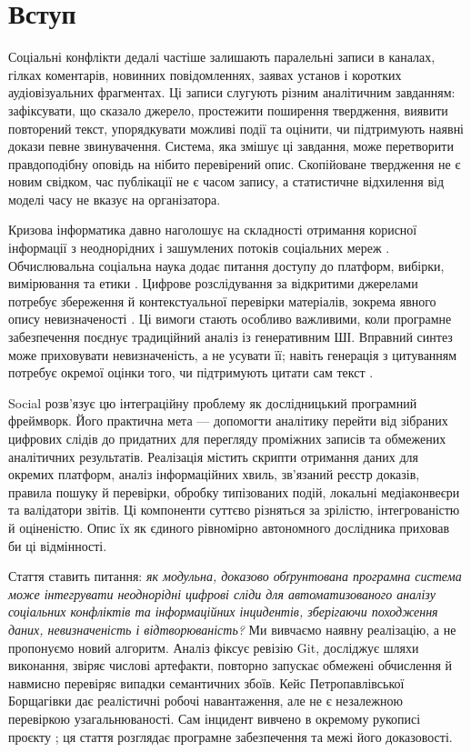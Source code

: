 \section{Вступ}
Соціальні конфлікти дедалі частіше залишають паралельні записи в каналах, гілках коментарів, новинних повідомленнях, заявах установ і коротких аудіовізуальних фрагментах. Ці записи слугують різним аналітичним завданням: зафіксувати, що сказало джерело, простежити поширення твердження, виявити повторений текст, упорядкувати можливі події та оцінити, чи підтримують наявні докази певне звинувачення. Система, яка змішує ці завдання, може перетворити правдоподібну оповідь на нібито перевірений опис. Скопійоване твердження не є новим свідком, час публікації не є часом запису, а статистичне відхилення від моделі часу не вказує на організатора.

Кризова інформатика давно наголошує на складності отримання корисної інформації з неоднорідних і зашумлених потоків соціальних мереж \citep{imran2015crisis}. Обчислювальна соціальна наука додає питання доступу до платформ, вибірки, вимірювання та етики \citep{Olteanu2019,VicentePaula2023}. Цифрове розслідування за відкритими джерелами потребує збереження й контекстуальної перевірки матеріалів, зокрема явного опису невизначеності \citep{berkeleyProtocol2022}. Ці вимоги стають особливо важливими, коли програмне забезпечення поєднує традиційний аналіз із генеративним ШІ. Вправний синтез може приховувати невизначеність, а не усувати її; навіть генерація з цитуванням потребує окремої оцінки того, чи підтримують цитати сам текст \citep{gao2023alce}.

Social розв'язує цю інтеграційну проблему як дослідницький програмний фреймворк. Його практична мета --- допомогти аналітику перейти від зібраних цифрових слідів до придатних для перегляду проміжних записів та обмежених аналітичних результатів. Реалізація містить скрипти отримання даних для окремих платформ, аналіз інформаційних хвиль, зв'язаний реєстр доказів, правила пошуку й перевірки, обробку типізованих подій, локальні медіаконвеєри та валідатори звітів. Ці компоненти суттєво різняться за зрілістю, інтегрованістю й оціненістю. Опис їх як єдиного рівномірно автономного дослідника приховав би ці відмінності.

Стаття ставить питання: \emph{як модульна, доказово обґрунтована програмна система може інтегрувати неоднорідні цифрові сліди для автоматизованого аналізу соціальних конфліктів та інформаційних інцидентів, зберігаючи походження даних, невизначеність і відтворюваність?} Ми вивчаємо наявну реалізацію, а не пропонуємо новий алгоритм. Аналіз фіксує ревізію Git, досліджує шляхи виконання, звіряє числові артефакти, повторно запускає обмежені обчислення й навмисно перевіряє випадки семантичних збоїв. Кейс Петропавлівської Борщагівки дає реалістичні робочі навантаження, але не є незалежною перевіркою узагальнюваності. Сам інцидент вивчено в окремому рукописі проєкту \citep{pylypenko2026case}; ця стаття розглядає програмне забезпечення та межі його доказовості.

